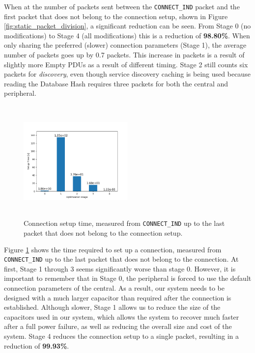 When at the number of packets sent between the \texttt{CONNECT\_IND} packet and the first packet that does not belong to the connection setup, shown in Figure \ref{fig:static_packet_division}, a significant reduction can be seen. From Stage 0 (no modifications) to Stage 4 (all modifications) this is a reduction of \textbf{98.80\%}. When only sharing the preferred (slower) connection parameters (Stage 1), the average number of packets goes up by 0.7 packets. This increase in packets is a result of slightly more Empty PDUs as a result of different timing. Stage 2 still counts six packets for \textit{discovery}, even though service discovery caching is being used because reading the Database Hash requires three packets for both the central and peripheral. 

\begin{figure}[]
    \centering
    \includegraphics[width=0.5\textwidth,height=6cm,keepaspectratio=true]{plots/static_setup_time.png}
    \caption{
        Connection setup time, measured from \texttt{CONNECT\_IND} up to the last packet that does not belong to the connection setup.
    }
    \label{fig:static_setup_time}
\end{figure}

Figure \ref{fig:static_setup_time} shows the time required to set up a connection, measured from \texttt{CONNECT\_IND} up to the last packet that does not belong to the connection. At first, Stage 1 through 3 seems significantly worse than stage 0. However, it is important to remember that in Stage 0, the peripheral is forced to use the default connection parameters of the central. As a result, our system needs to be designed with a much larger capacitor than required after the connection is established. Although slower, Stage 1 allows us to reduce the size of the capacitors used in our system, which allows the system to recover much faster after a full power failure, as well as reducing the overall size and cost of the system. Stage 4 reduces the connection setup to a single packet, resulting in a reduction of \textbf{99.93\%}.

